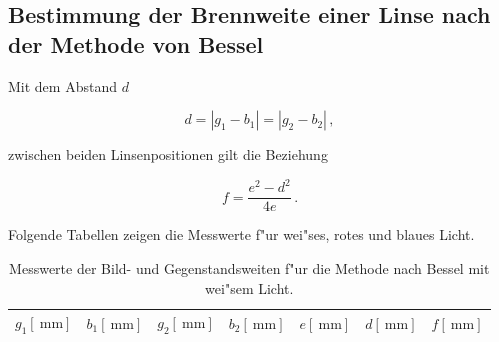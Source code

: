 	\clearpage

	\subsection{Bestimmung der Brennweite einer Linse nach der Methode von Bessel}
		\label{subsec:bessel}

		Mit dem Abstand $d$

		\begin{equation*}
			d = |g_1 - b_1| = |g_2 - b_2| \, ,
		\end{equation*}

		zwischen beiden Linsenpositionen gilt die Beziehung


		\begin{equation}
			f = \frac{e^2 - d^2}{4e} \, .
		\end{equation}

		Folgende Tabellen zeigen die Messwerte f"ur wei"ses, rotes und blaues Licht.

		\begin{table}[!h]
			\begin{center}
				\label{tabelle:bessel}
				\caption{Messwerte der Bild- und Gegenstandsweiten f"ur die Methode nach Bessel mit wei"sem Licht.}
				\begin{tabular}{|c|c|c|c|c|c|c|}
					\hline 
					$g_1 [\SI{}{\milli \meter}]$ & $b_1 [\SI{}{\milli \meter}]$ & $g_2 [\SI{}{\milli \meter}]$ & $b_2 [\SI{}{\milli \meter}]$ & $e [\SI{}{\milli \meter}]$ & $d [\SI{}{\milli \meter}]$ & $f [\SI{}{\milli \meter}]$\\
					\hline 
					\hline
					
					\hline 
				\end{tabular}
			\end{center}
		\end{table}

